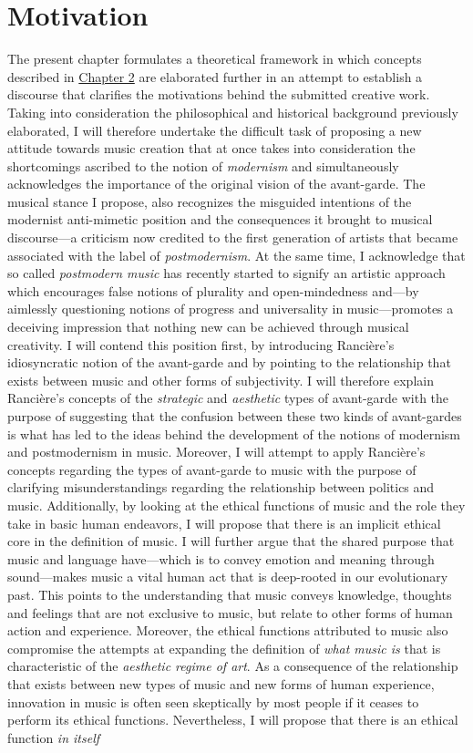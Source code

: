 \hypertarget{chapter3}{}
\chapter{Motivation}

The present chapter formulates a theoretical framework in which concepts described in \hyperlink{chapter2}{Chapter 2} are elaborated further in an attempt to establish a discourse that clarifies the motivations behind the submitted creative work. Taking into consideration the philosophical and historical background previously elaborated, I will therefore undertake the difficult task of proposing a new attitude towards music creation that at once takes into consideration the shortcomings ascribed to the notion of \emph{modernism} and simultaneously acknowledges the importance of the original vision of the avant-garde. The musical stance I propose, also recognizes the misguided intentions of the modernist anti-mimetic position and the consequences it brought to musical discourse---a criticism now credited to the first generation of artists that became associated with the label of \emph{postmodernism}. At the same time, I acknowledge that so called \emph{postmodern music} has recently started to signify an artistic approach which encourages false notions of plurality and open-mindedness and---by aimlessly questioning notions of progress and universality in music---promotes a deceiving impression that nothing new can be achieved through musical creativity. I will contend this position first, by introducing Ranci\`{e}re's idiosyncratic notion of the avant-garde and by pointing to the relationship that exists between music and other forms of subjectivity. I will therefore explain Ranci\`{e}re's concepts of the \emph{strategic} and \emph{aesthetic} types of avant-garde with the purpose of suggesting that the confusion between these two kinds of avant-gardes is what has led to the ideas behind the development of the notions of modernism and postmodernism in music. Moreover, I will attempt to apply Ranci\`{e}re's concepts regarding the types of avant-garde to music with the purpose of clarifying misunderstandings regarding the relationship between politics and music. Additionally,  by looking at the ethical functions of music and the role they take in basic human endeavors, I will propose that there is an implicit ethical core in the definition of music. I will further argue that the shared purpose that music and language have---which is to convey emotion and meaning through sound---makes music a vital human act that is deep-rooted in our evolutionary past. This points to the understanding that music conveys knowledge, thoughts and feelings that are not exclusive to music, but relate to other forms of human action and experience. Moreover, the ethical functions attributed to music also compromise the attempts at expanding the definition of \emph{what music is} that is characteristic of the \emph{aesthetic regime of art}. As a consequence of the relationship that exists between new types of music and new forms of human experience, innovation in music is often seen skeptically by most people if it ceases to perform its ethical functions. Nevertheless, I will propose that there is an ethical function \emph{in itself} 